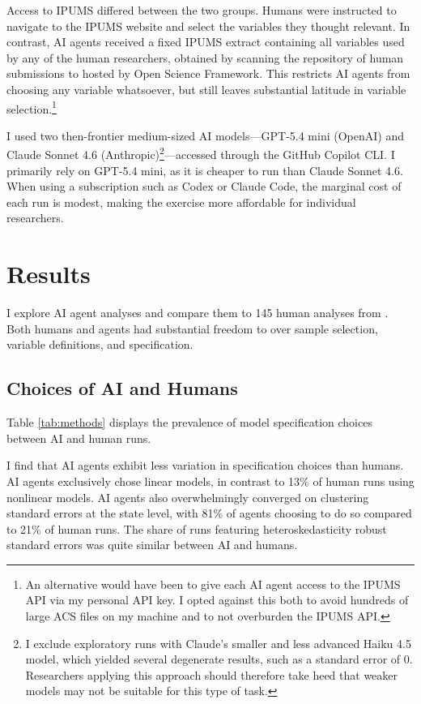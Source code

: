 \documentclass[
  12pt]{article}
\begin{document}
Access to IPUMS differed between the two groups. Humans were instructed
to navigate to the IPUMS website and select the variables they thought
relevant. In contrast, AI agents received a fixed IPUMS extract
containing all variables used by any of the human researchers, obtained
by scanning the repository of human submissions to
\citet{huntingtonklein2025sources} hosted by Open Science Framework.
This restricts AI agents from choosing any variable whatsoever, but
still leaves substantial latitude in variable
selection.\footnote{An alternative would have been to give each AI agent access to the IPUMS API via my personal API key. I opted against this both to avoid hundreds of large ACS files on my machine and to not overburden the IPUMS API.}

I used two then-frontier medium-sized AI models---GPT-5.4 mini (OpenAI)
and Claude Sonnet 4.6
(Anthropic)\footnote{I exclude \aiExcludedModelRuns{} exploratory runs with Claude's smaller and less advanced Haiku 4.5 model, which yielded several degenerate results, such as a standard error of 0. Researchers applying this approach should therefore take heed that weaker models may not be suitable for this type of task.}---accessed
through the GitHub Copilot CLI. I primarily rely on GPT-5.4 mini, as it
is cheaper to run than Claude Sonnet 4.6. When using a subscription such
as Codex or Claude Code, the marginal cost of each run is modest, making
the exercise more affordable for individual researchers.

\section{Results}\label{sec-results}

I explore \aiAnalyticN{} AI agent analyses and compare them to 145 human
analyses from \citet{huntingtonklein2025sources}. Both humans and agents
had substantial freedom to over sample selection, variable definitions,
and specification.

\subsection{Choices of AI and Humans}\label{choices-of-ai-and-humans}

Table \ref{tab:methods} displays the prevalence of model specification
choices between AI and human runs.



I find that AI agents exhibit less variation in specification choices
than humans. AI agents exclusively chose linear models, in contrast to
13\% of human runs using nonlinear models. AI agents also overwhelmingly
converged on clustering standard errors at the state level, with 81\% of
agents choosing to do so compared to 21\% of human runs. The share of
runs featuring heteroskedasticity robust standard errors was quite
similar between AI and humans.
\end{document}
